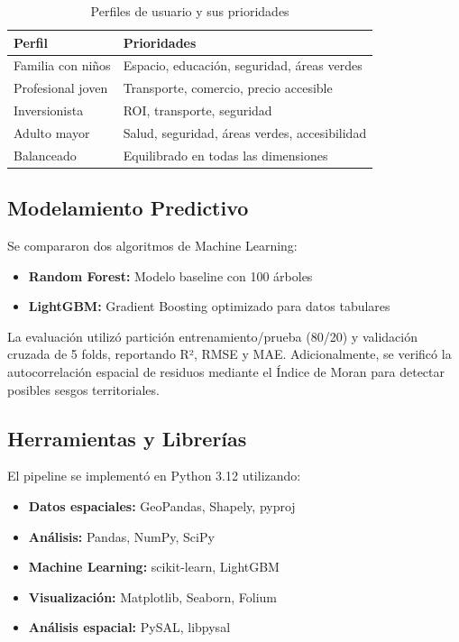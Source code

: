 \documentclass[11pt,letterpaper]{article}
\begin{document}
\begin{table}[H]
\centering
\caption{Perfiles de usuario y sus prioridades}
\label{tab:perfiles}
\begin{tabular}{@{}lp{10cm}@{}}
\toprule
\textbf{Perfil} & \textbf{Prioridades} \\
\midrule
Familia con niños & Espacio, educación, seguridad, áreas verdes \\
Profesional joven & Transporte, comercio, precio accesible \\
Inversionista & ROI, transporte, seguridad \\
Adulto mayor & Salud, seguridad, áreas verdes, accesibilidad \\
Balanceado & Equilibrado en todas las dimensiones \\
\bottomrule
\end{tabular}
\end{table}

\subsection{Modelamiento Predictivo}

Se compararon dos algoritmos de Machine Learning:

\begin{itemize}
    \item \textbf{Random Forest:} Modelo baseline con 100 árboles
    \item \textbf{LightGBM:} Gradient Boosting optimizado para datos tabulares
\end{itemize}

La evaluación utilizó partición entrenamiento/prueba (80/20) y validación cruzada de 5 folds, reportando R², RMSE y MAE. Adicionalmente, se verificó la autocorrelación espacial de residuos mediante el Índice de Moran para detectar posibles sesgos territoriales.

\subsection{Herramientas y Librerías}

El pipeline se implementó en Python 3.12 utilizando:

\begin{itemize}
    \item \textbf{Datos espaciales:} GeoPandas, Shapely, pyproj
    \item \textbf{Análisis:} Pandas, NumPy, SciPy
    \item \textbf{Machine Learning:} scikit-learn, LightGBM
    \item \textbf{Visualización:} Matplotlib, Seaborn, Folium
    \item \textbf{Análisis espacial:} PySAL, libpysal
\end{itemize}
\end{document}
